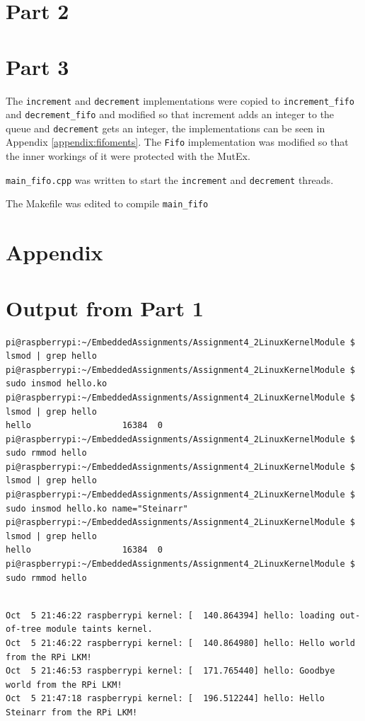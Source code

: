\documentclass{article}
\begin{document}
\newpage
\section*{Part 2}


\section*{Part 3}
The \verb!increment! and \verb!decrement! implementations were copied to \verb!increment_fifo! and \verb!decrement_fifo! and modified so that increment adds an integer to the queue and \verb!decrement! gets an integer, the implementations can be seen in Appendix \ref{appendix:fifoments}. The \verb!Fifo! implementation was modified so that the inner workings of it were protected with the MutEx.

\verb!main_fifo.cpp! was written to start the \verb!increment! and \verb!decrement! threads. 


The Makefile was edited to compile \verb!main_fifo!

\section*{Appendix}
\appendix
\section{Output from Part 1}
\begin{lstlisting}[caption={src/hello.cpp, writes "Hello" to stdout}]
pi@raspberrypi:~/EmbeddedAssignments/Assignment4_2LinuxKernelModule $ lsmod | grep hello
pi@raspberrypi:~/EmbeddedAssignments/Assignment4_2LinuxKernelModule $ sudo insmod hello.ko
pi@raspberrypi:~/EmbeddedAssignments/Assignment4_2LinuxKernelModule $ lsmod | grep hello
hello                  16384  0
pi@raspberrypi:~/EmbeddedAssignments/Assignment4_2LinuxKernelModule $ sudo rmmod hello
pi@raspberrypi:~/EmbeddedAssignments/Assignment4_2LinuxKernelModule $ lsmod | grep hello
pi@raspberrypi:~/EmbeddedAssignments/Assignment4_2LinuxKernelModule $ sudo insmod hello.ko name="Steinarr"
pi@raspberrypi:~/EmbeddedAssignments/Assignment4_2LinuxKernelModule $ lsmod | grep hello
hello                  16384  0
pi@raspberrypi:~/EmbeddedAssignments/Assignment4_2LinuxKernelModule $ sudo rmmod hello
\end{lstlisting}

\begin{lstlisting}

Oct  5 21:46:22 raspberrypi kernel: [  140.864394] hello: loading out-of-tree module taints kernel.
Oct  5 21:46:22 raspberrypi kernel: [  140.864980] hello: Hello world from the RPi LKM!
Oct  5 21:46:53 raspberrypi kernel: [  171.765440] hello: Goodbye world from the RPi LKM!
Oct  5 21:47:18 raspberrypi kernel: [  196.512244] hello: Hello Steinarr from the RPi LKM!
\end{lstlisting}
\end{document}
